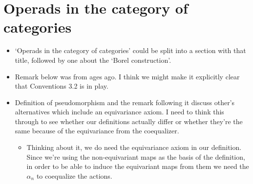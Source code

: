\documentclass{amsart}
\begin{document}
\section{Operads in the category of categories}
\begin{itemize}
\item `Operads in the category of categories' could be split into a section with that title, followed by one about the `Borel construction'.
\item Remark below was from ages ago. I think we might make it explicitly clear that Conventions 3.2 is in play.
\item Definition of pseudomorphism and the remark following it discuss other's alternatives which include an equivariance axiom. I need to think this through to see whether our definitions actually differ or whether they're the same because of the equivariance from the coequalizer.
	\begin{itemize}
		\item Thinking about it, we do need the equivariance axiom in our definition. Since we're using the non-equivariant maps as the basis of the definition, in order to be able to induce the equivariant maps from them we need the $\alpha_n$ to coequalize the actions.
	\end{itemize}
\end{itemize}
\end{document}

